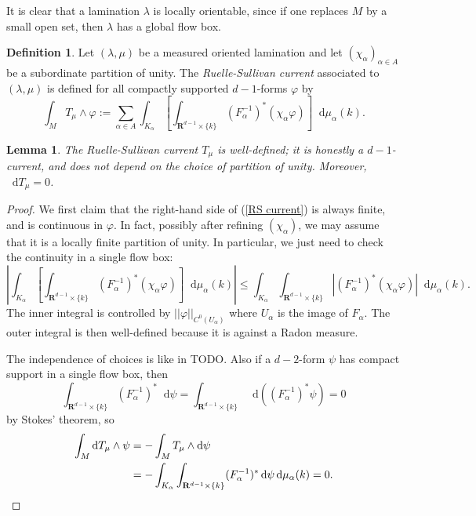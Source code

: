 \documentclass[reqno,10pt]{amsart}
\newcommand{\RR}{\mathbf{R}}
\newcommand*\dif{\mathop{}\!\mathrm{d}}
\newcommand{\dfn}[1]{\emph{#1}\index{#1}}
\newtheorem{lemma}[theorem]{Lemma}
\theoremstyle{definition}
\newtheorem{definition}[theorem]{Definition}
\numberwithin{equation}{section}
\begin{document}
It is clear that a lamination $\lambda$ is locally orientable, since if one replaces $M$ by a small open set, then $\lambda$ has a global flow box.

\begin{definition}
Let $(\lambda, \mu)$ be a measured oriented lamination and let $(\chi_\alpha)_{\alpha \in A}$ be a subordinate partition of unity.
The \dfn{Ruelle-Sullivan current} associated to $(\lambda, \mu)$ is defined for all compactly supported $d-1$-forms $\varphi$ by
\begin{equation}\label{RS current}
\int_M T_\mu \wedge \varphi := \sum_{\alpha \in A} \int_{K_\alpha} \left[\int_{\RR^{d - 1} \times \{k\}} (F_\alpha^{-1})^* (\chi_\alpha \varphi) \right] \dif \mu_\alpha(k).
\end{equation}
\end{definition}

\begin{lemma}
The Ruelle-Sullivan current $T_\mu$ is well-defined; it is honestly a $d-1$-current, and does not depend on the choice of partition of unity.
Moreover, $\dif T_\mu = 0$.
\end{lemma}
\begin{proof}
We first claim that the right-hand side of (\ref{RS current}) is always finite, and is continuous in $\varphi$.
In fact, possibly after refining $(\chi_\alpha)$, we may assume that it is a locally finite partition of unity.
In particular, we just need to check the continuity in a single flow box:
$$\left|\int_{K_\alpha} \left[\int_{\RR^{d - 1} \times \{k\}} (F_\alpha^{-1})^* (\chi_\alpha \varphi) \right] \dif \mu_\alpha(k)\right| \leq \int_{K_\alpha} \int_{\RR^{d - 1} \times \{k\}} |(F_\alpha^{-1})^* (\chi_\alpha \varphi)| \dif \mu_\alpha(k).$$
The inner integral is controlled by $||\varphi||_{C^0(U_\alpha)}$ where $U_\alpha$ is the image of $F_\alpha$.
The outer integral is then well-defined because it is against a Radon measure.

The independence of choices is like in \cite[Theorem 8.2]{daskalopoulos2020transverse} TODO.
Also if a $d-2$-form $\psi$ has compact support in a single flow box, then
$$\int_{\RR^{d - 1} \times \{k\}} (F_\alpha^{-1})^* \dif \psi = \int_{\RR^{d - 1} \times \{k\}} \dif((F_\alpha^{-1})^* \psi) = 0$$
by Stokes' theorem, so 
\begin{align*}
\int_M \dif T_\mu \wedge \psi &= -\int_M T_\mu \wedge \dif \psi \\
&= -\int_{K_\alpha} \int_{\RR^{d - 1} \times \{k\}} (F_\alpha^{-1})^* \dif \psi \dif \mu_\alpha(k) = 0. \qedhere
\end{align*}
\end{proof}
\end{document}
